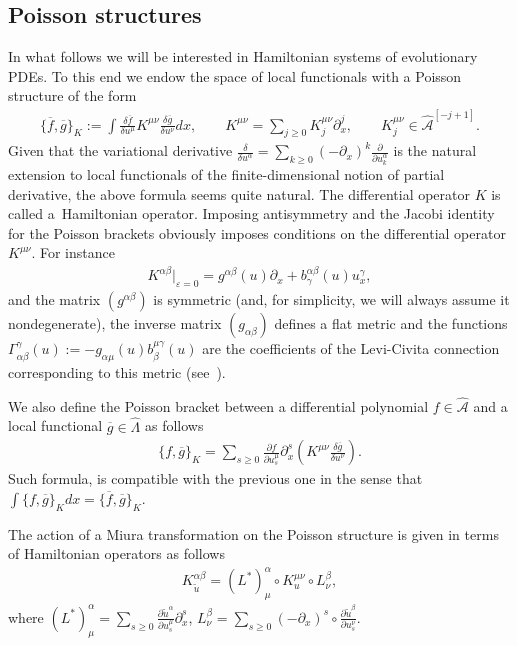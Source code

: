 \documentclass[pdftex]{sigma}
\numberwithin{equation}{section}
\newcommand{\og}{\overline g}
\newcommand{\hLambda}{\widehat\Lambda}
\def\d{{\partial}}
\newcommand{\<}{\left<}
\renewcommand{\>}{\right>}
\newcommand{\eps}{\varepsilon}
\newcommand{\hcA}{\widehat{\mathcal A}}
\begin{document}
\subsection{Poisson structures} In what follows we will be interested in Hamiltonian systems of evolutionary PDEs. To this end we endow the space of local functionals with a Poisson structure of the form
\begin{gather*}\big\{\overline{f},\og\big\}_K :=\int \frac{\delta \overline{f}}{\delta u^\mu} K^{\mu\nu} \frac{\delta \og}{\delta u^\nu}dx,\qquad
K^{\mu\nu} = \sum\limits_{j\geq 0} K^{\mu\nu}_j \d_x^j, \qquad K^{\mu\nu}_j \in \hcA^{[-j+1]}.
\end{gather*}
Given that the variational derivative $\frac{\delta}{\delta u^\alpha} = \sum\limits_{k\geq 0} (-\d_x)^k \frac{\d}{\d u^\alpha_k}$ is the natural extension to local functionals of the f\/inite-dimensional notion of partial derivative, the above formula seems quite natural. The dif\/ferential operator $K$ is called a~Hamiltonian operator. Imposing antisymmetry and the Jacobi identity for the Poisson brackets obviously imposes conditions on the dif\/ferential operator $K^{\mu\nu}$. For instance
\begin{gather*}%
K^{\alpha\beta}\big|_{\eps=0}=g^{\alpha\beta}(u)\d_x+b^{\alpha\beta}_\gamma(u)u^\gamma_x,
\end{gather*}
and the matrix $(g^{\alpha\beta})$ is symmetric (and, for simplicity, we will always assume it nondegenerate), the inverse matrix $(g_{\alpha\beta})$ def\/ines a f\/lat metric and the functions $\Gamma_{\alpha\beta}^\gamma(u):=-g_{\alpha\mu}(u)b^{\mu\gamma}_\beta(u)$ are the coef\/f\/icients of the Levi-Civita connection corresponding to this metric (see~\cite{DN83}).

We also def\/ine the Poisson bracket between a dif\/ferential polynomial $f\in \hcA$ and a local functional $\og \in \hLambda$ as follows{\samepage
\begin{gather*} \{f,\og\}_K = \sum_{s\geq 0} \frac{\d f}{\d u^\mu_s} \d_x^s\left( K^{\mu\nu} \frac{\delta \og}{\delta u^\nu}\right).\end{gather*}
Such formula, is compatible with the previous one in the sense that $\int \{f,\og\}_K dx = \{\overline{f},\og\}_K$.}

The action of a Miura transformation on the Poisson structure is given in terms of Hamiltonian operators as follows
\begin{gather*}K_{\widetilde u}^{\alpha\beta} = (L^*)^\alpha_\mu \circ K_u^{\mu\nu} \circ L^\beta_\nu,\end{gather*}
where $(L^*)^\alpha_\mu = \sum\limits_{s\geq 0} \frac{\partial \widetilde u^\alpha}{\partial u^\mu_s} \partial_x^s$, $L^\beta_\nu = \sum\limits_{s\geq 0} (-\partial_x)^s \circ\frac{\partial \widetilde u^\beta}{\partial u^\nu_s}$.
\end{document}
